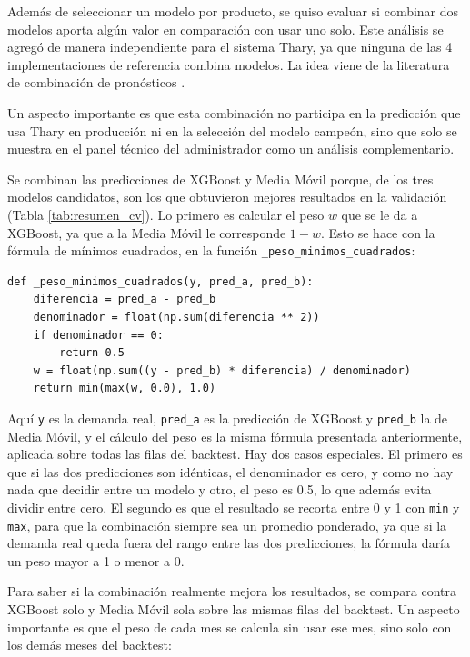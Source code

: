 Además de seleccionar un modelo por producto, se quiso evaluar si combinar dos modelos aporta algún valor en comparación con usar uno solo. Este análisis se agregó de manera independiente para el sistema Thary, ya que ninguna de las 4 implementaciones de referencia combina modelos. La idea viene de la literatura de combinación de pronósticos \cite{bates1969combination, granger1984improved}.

Un aspecto importante es que esta combinación no participa en la predicción que usa Thary en producción ni en la selección del modelo campeón, sino que solo se muestra en el panel técnico del administrador como un análisis complementario.

Se combinan las predicciones de XGBoost y Media Móvil porque, de los tres modelos candidatos, son los que obtuvieron mejores resultados en la validación (Tabla \ref{tab:resumen_cv}). Lo primero es calcular el peso $w$ que se le da a XGBoost, ya que a la Media Móvil le corresponde $1 - w$. Esto se hace con la fórmula de mínimos cuadrados, en la función \texttt{\_peso\_minimos\_cuadrados}:

\label{lst:combinacion_peso}
\begin{verbatim}
def _peso_minimos_cuadrados(y, pred_a, pred_b):
    diferencia = pred_a - pred_b
    denominador = float(np.sum(diferencia ** 2))
    if denominador == 0:
        return 0.5
    w = float(np.sum((y - pred_b) * diferencia) / denominador)
    return min(max(w, 0.0), 1.0)
\end{verbatim}

Aquí \texttt{y} es la demanda real, \texttt{pred\_a} es la predicción de XGBoost y \texttt{pred\_b} la de Media Móvil, y el cálculo del peso es la misma fórmula presentada anteriormente, aplicada sobre todas las filas del backtest. Hay dos casos especiales. El primero es que si las dos predicciones son idénticas, el denominador es cero, y como no hay nada que decidir entre un modelo y otro, el peso es 0.5, lo que además evita dividir entre cero. El segundo es que el resultado se recorta entre 0 y 1 con \texttt{min} y \texttt{max}, para que la combinación siempre sea un promedio ponderado, ya que si la demanda real queda fuera del rango entre las dos predicciones, la fórmula daría un peso mayor a 1 o menor a 0.

Para saber si la combinación realmente mejora los resultados, se compara contra XGBoost solo y Media Móvil sola sobre las mismas filas del backtest. Un aspecto importante es que el peso de cada mes se calcula sin usar ese mes, sino solo con los demás meses del backtest:


